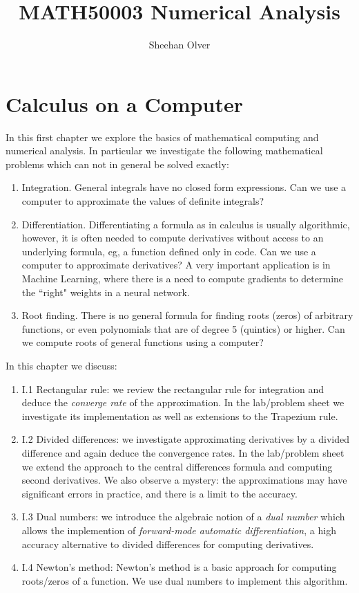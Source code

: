 \documentclass[12pt,a4paper]{book}
\title{ MATH50003 Numerical Analysis }
\author{ Sheehan Olver }
\theoremstyle{definition}
\begin{document}
\maketitle

\tableofcontents

\chapter{Calculus on a Computer}

In this first chapter we explore the basics of mathematical computing and numerical analysis.
In particular we investigate the following mathematical problems which can not in general be solved exactly:

\begin{enumerate}
\item Integration. General integrals have no closed form expressions. Can we use a computer to approximate the values of definite integrals?
\item Differentiation. Differentiating a formula as in calculus is usually algorithmic, however, it is often needed to compute derivatives without access to an underlying formula, eg,  a function defined only in code. Can we use a computer to approximate derivatives?  A very important application is in Machine Learning, where there is a need to compute gradients to determine the ``right" weights in a neural network.
\item Root finding. There is no general formula for finding roots (zeros) of arbitrary functions, or even polynomials that are of degree 5 (quintics) or higher. Can we compute roots of general functions using a computer?
\end{enumerate}

In this chapter we discuss:

\begin{enumerate}
\item I.1 Rectangular rule: we review the rectangular rule for integration and deduce the {\it converge rate} of the approximation. In the lab/problem sheet  we investigate its implementation as well as extensions to the Trapezium rule.
\item I.2 Divided differences: we investigate approximating derivatives by a divided difference and again deduce the convergence rates. In the lab/problem sheet we extend the approach to the central differences formula and computing second derivatives. We also observe a mystery: the approximations may have significant errors in practice, and there is a limit to the accuracy.
\item I.3 Dual numbers: we introduce the algebraic notion of a {\it dual number} which allows the implemention of {\it forward-mode automatic differentiation}, a high accuracy alternative to divided differences for computing derivatives.
\item I.4 Newton's method: Newton's method is a basic approach for computing roots/zeros of a function. We use dual numbers to implement this algorithm.
\end{enumerate}
\end{document}
